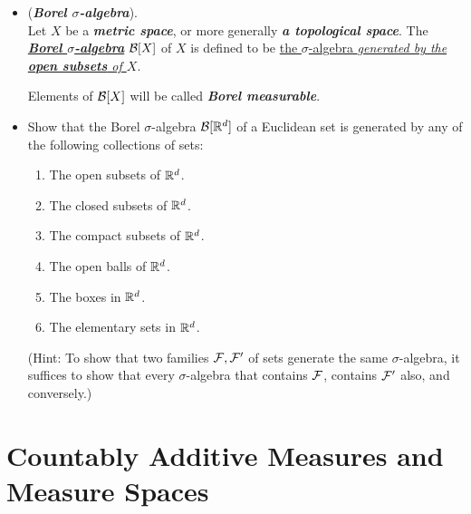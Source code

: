 \documentclass[11pt]{article}
\begin{document}
\begin{itemize}
\item \begin{definition} (\emph{\textbf{Borel $\sigma$-algebra}}). \citep{tao2011introduction} \\
 Let $X$ be a \emph{\textbf{metric space}}, or more generally \emph{\textbf{a topological space}}. The \underline{\emph{\textbf{Borel $\sigma$-algebra}}} ${\mathcal B}[X]$ of $X$ is defined to be \underline{the $\sigma$-algebra \emph{generated by the \textbf{open subsets} of $X$}}.

Elements of ${\mathcal B}[X]$ will be called \emph{\textbf{Borel measurable}}.
\end{definition}

\item \begin{exercise}
Show that the Borel $\sigma$-algebra ${\mathcal B}[{\mathbb R}^d]$ of a Euclidean set is generated by any of the following collections of sets:
\begin{enumerate}
\item The open subsets of ${\mathbb R}^d$.
\item The closed subsets of ${\mathbb R}^d$.
\item The compact subsets of ${\mathbb R}^d$.
\item The open balls of ${\mathbb R}^d$.
\item The boxes in ${\mathbb R}^d$.
\item The elementary sets in ${\mathbb R}^d$.
\end{enumerate} 
(Hint: To show that two families ${\mathcal F}, {\mathcal F}'$ of sets generate the same $\sigma$-algebra, it suffices to show that every $\sigma$-algebra that contains ${\mathcal F}$, contains ${\mathcal F}'$ also, and conversely.)
\end{exercise}
\end{itemize}

\newpage
\section{Countably Additive Measures and Measure Spaces}
\end{document}
